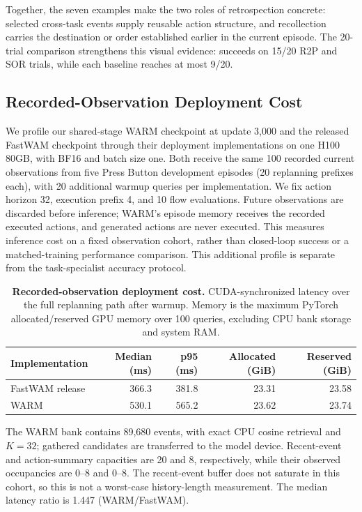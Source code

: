 Together, the seven examples make the two roles of retrospection concrete: selected cross-task events supply reusable action structure, and recollection carries the destination or order established earlier in the current episode.
The 20-trial comparison strengthens this visual evidence: \method{} succeeds on 15/20 R2P and SOR trials, while each baseline reaches at most 9/20.

\subsection{Recorded-Observation Deployment Cost}
\label{app:recorded_cost}

We profile our shared-stage WARM checkpoint at update 3,000 and the released FastWAM checkpoint through their deployment implementations on one H100 80GB, with BF16 and batch size one.
Both receive the same 100 recorded current observations from five Press Button development episodes (20 replanning prefixes each), with 20 additional warmup queries per implementation.
We fix action horizon 32, execution prefix 4, and 10 flow evaluations.
Future observations are discarded before inference; WARM's episode memory receives the recorded executed actions, and generated actions are never executed.
This measures inference cost on a fixed observation cohort, rather than closed-loop success or a matched-training performance comparison. This additional profile is separate from the task-specialist accuracy protocol.

\begin{table}[h]
\centering\small
\caption{\textbf{Recorded-observation deployment cost.} CUDA-synchronized latency over the full replanning path after warmup. Memory is the maximum PyTorch allocated/reserved GPU memory over 100 queries, excluding CPU bank storage and system RAM.}
\label{tab:recorded_cost}
\begin{tabular}{@{}lrrrr@{}}
\toprule
Implementation & Median (ms) & p95 (ms) & Allocated (GiB) & Reserved (GiB) \\
\midrule
FastWAM release & 366.3 & 381.8 & 23.31 & 23.58 \\
WARM & 530.1 & 565.2 & 23.62 & 23.74 \\
\bottomrule
\end{tabular}
\end{table}

The WARM bank contains 89,680 events, with exact CPU cosine retrieval and $K=32$; gathered candidates are transferred to the model device.
Recent-event and action-summary capacities are 20 and 8, respectively, while their observed occupancies are 0--8 and 0--8.
The recent-event buffer does not saturate in this cohort, so this is not a worst-case history-length measurement.
The median latency ratio is 1.447 (WARM/FastWAM).


